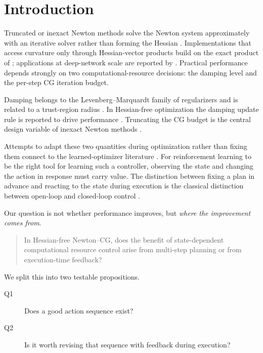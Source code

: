 \section{Introduction}
\label{sec:intro}

Truncated or inexact Newton methods solve the Newton system approximately with an
iterative solver rather than forming the Hessian
\citep{dembo1982inexact,steihaug1983cg,nash1984lanczos,nash2000survey}.
Implementations that access curvature only through Hessian-vector products build
on the exact product of \citet{pearlmutter1994hvp}; applications at deep-network
scale are reported by \citet{martens2010hessianfree,martens2011rnn}. Practical
performance depends strongly on two computational-resource decisions: the
damping level and the per-step CG iteration budget.

Damping belongs to the Levenberg--Marquardt family of regularizers
\citep{levenberg1944,marquardt1963} and is related to a trust-region radius
\citep{steihaug1983cg,conn2000trustregion}. In Hessian-free optimization the
damping update rule is reported to drive performance
\citep{martens2010hessianfree,martens2011rnn}. Truncating the CG budget is the
central design variable of inexact Newton methods
\citep{dembo1982inexact,nash2000survey}.

Attempts to adapt these two quantities during optimization rather than fixing
them connect to the learned-optimizer literature
\citep{andrychowicz2016l2l,metz2019pathologies,metz2020effective,bae2022apo}.
For reinforcement learning \citep{schulman2017ppo} to be the right tool for
learning such a controller, observing the state and changing the action in
response must carry value. The distinction between fixing a plan in advance and
reacting to the state during execution is the classical distinction between
open-loop and closed-loop control \citep{bertsekas2017dp}.

Our question is not whether performance improves, but \emph{where the
improvement comes from}.

\begin{quote}
In Hessian-free Newton--CG, does the benefit of state-dependent computational
resource control arise from multi-step planning or from execution-time feedback?
\end{quote}

We split this into two testable propositions.

\begin{description}
  \item[Q1] Does a good action sequence exist?
  \item[Q2] Is it worth revising that sequence with feedback during execution?
\end{description}

